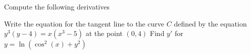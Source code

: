 \documentclass[11pt]{exam}
\renewcommand{\d}[1]{\ensuremath{\operatorname{d}\!{#1}}}
\newcommand{\ddx}[1]{\frac{\d{}}{\d{#1}}}
\begin{document}
\begin{questions}

\vspace*{-150pt}
\addpoints\question
\begin{changemargin}{0pt}{137.4803pt}
	Compute the following derivatives
\end{changemargin}	

\newpage
\addpoints
\question[3]
Write the equation for the tangent line to the curve $C$ defined by the equation $y^3(y-4)=x(x^3-5)$ at the point $(0,4)$
\addpoints\vspace{280pt}
\question[3]
Find $y'$ for $y=\ln(\cos^2(x)+y^2)$




\end{questions}
\end{document}
